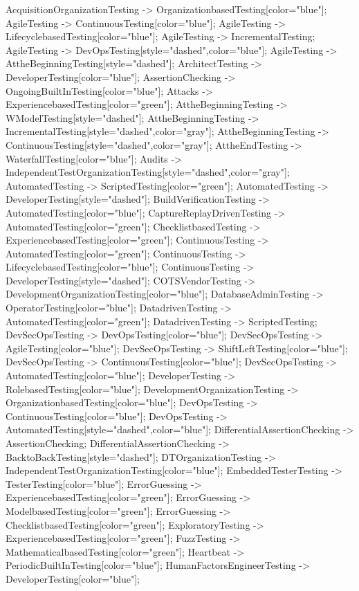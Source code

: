 \documentclass{article}
\begin{document}
{AcquisitionOrganizationTesting -> OrganizationbasedTesting[color="blue"];
AgileTesting -> ContinuousTesting[color="blue"];
AgileTesting -> LifecyclebasedTesting[color="blue"];
AgileTesting -> IncrementalTesting;
AgileTesting -> DevOpsTesting[style="dashed",color="blue"];
AgileTesting -> AttheBeginningTesting[style="dashed"];
ArchitectTesting -> DeveloperTesting[color="blue"];
AssertionChecking -> OngoingBuiltInTesting[color="blue"];
Attacks -> ExperiencebasedTesting[color="green"];
AttheBeginningTesting -> WModelTesting[style="dashed"];
AttheBeginningTesting -> IncrementalTesting[style="dashed",color="gray"];
AttheBeginningTesting -> ContinuousTesting[style="dashed",color="gray"];
AttheEndTesting -> WaterfallTesting[color="blue"];
Audits -> IndependentTestOrganizationTesting[style="dashed",color="gray"];
AutomatedTesting -> ScriptedTesting[color="green"];
AutomatedTesting -> DeveloperTesting[style="dashed"];
BuildVerificationTesting -> AutomatedTesting[color="blue"];
CaptureReplayDrivenTesting -> AutomatedTesting[color="green"];
ChecklistbasedTesting -> ExperiencebasedTesting[color="green"];
ContinuousTesting -> AutomatedTesting[color="green"];
ContinuousTesting -> LifecyclebasedTesting[color="blue"];
ContinuousTesting -> DeveloperTesting[style="dashed"];
COTSVendorTesting -> DevelopmentOrganizationTesting[color="blue"];
DatabaseAdminTesting -> OperatorTesting[color="blue"];
DatadrivenTesting -> AutomatedTesting[color="green"];
DatadrivenTesting -> ScriptedTesting;
DevSecOpsTesting -> DevOpsTesting[color="blue"];
DevSecOpsTesting -> AgileTesting[color="blue"];
DevSecOpsTesting -> ShiftLeftTesting[color="blue"];
DevSecOpsTesting -> ContinuousTesting[color="blue"];
DevSecOpsTesting -> AutomatedTesting[color="blue"];
DeveloperTesting -> RolebasedTesting[color="blue"];
DevelopmentOrganizationTesting -> OrganizationbasedTesting[color="blue"];
DevOpsTesting -> ContinuousTesting[color="blue"];
DevOpsTesting -> AutomatedTesting[style="dashed",color="blue"];
DifferentialAssertionChecking -> AssertionChecking;
DifferentialAssertionChecking -> BacktoBackTesting[style="dashed"];
DTOrganizationTesting -> IndependentTestOrganizationTesting[color="blue"];
EmbeddedTesterTesting -> TesterTesting[color="blue"];
ErrorGuessing -> ExperiencebasedTesting[color="green"];
ErrorGuessing -> ModelbasedTesting[color="green"];
ErrorGuessing -> ChecklistbasedTesting[color="green"];
ExploratoryTesting -> ExperiencebasedTesting[color="green"];
FuzzTesting -> MathematicalbasedTesting[color="green"];
Heartbeat -> PeriodicBuiltInTesting[color="blue"];
HumanFactorsEngineerTesting -> DeveloperTesting[color="blue"];
}
\end{document}
